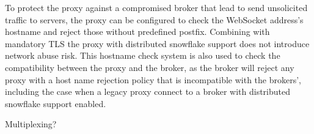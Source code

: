 \documentclass[letterpaper,twocolumn]{article}
\begin{document}
To protect the proxy against a compromised broker that lead to send unsolicited traffic to servers, the proxy can be configured to check the WebSocket address's hostname and reject those without predefined postfix. Combining with mandatory TLS the proxy with distributed snowflake support does not introduce network abuse risk. This hostname check system is also used to check the compatibility between the proxy and the broker, as the broker will reject any proxy with a host name rejection policy that is incompatible with the brokers', including the case when a legacy proxy connect to a broker with distributed snowflake support enabled.

Multiplexing?

%

%



\end{document}
